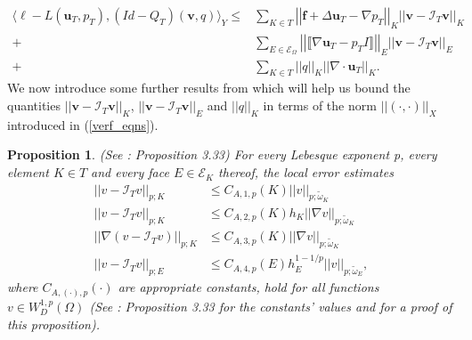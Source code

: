 \documentclass[12pt,a4paper]{article}
\newtheorem{proposition}[theorem]{Proposition}
\theoremstyle{definition}
\begin{document}
\begin{equation}\label{verf-a-posteriori-bound-cs}
\begin{aligned}
\langle \ell -L\left(\textbf{u}_T,p_T\right),\left(Id-Q_T\right)\left(\textbf{v},q\right) \rangle_Y\leq
&\sum_{K\in T}\left|\left|\textbf{f}+\Delta \textbf{u}_T-\nabla p_T \right|\right|_K \left|\left|\textbf{v}-\mathcal{I}_T\textbf{v}\right|\right|_K\\
+&\sum_{E\in \mathcal{E}_{\Omega}}\left|\left|\llbracket\nabla \textbf{u}_T-p_TI\rrbracket \right|\right|_E \left|\left|\textbf{v}-\mathcal{I}_T\textbf{v}\right|\right|_E\\
+&\sum_{K\in T}\left|\left|q\right|\right|_K\left|\left|\nabla \cdot \textbf{u}_T\right|\right|_K.
\end{aligned}
\end{equation}
We now introduce some further results from \cite{verfurth2013posteriori} which will help us bound the quantities $\left|\left|\textbf{v}-\mathcal{I}_T\textbf{v}\right|\right|_K$, $\left|\left|\textbf{v}-\mathcal{I}_T\textbf{v}\right|\right|_E$ and $\left|\left|q\right|\right|_K$ in terms of the norm $\left|\left|\left(\cdot,\cdot\right)\right|\right|_X$ introduced in (\ref{verf_eqns}).
\begin{proposition}{(See \cite[ \S3.5]{verfurth2013posteriori}: Proposition 3.33)} \label{verf_prop_bounds} For every Lebesque exponent p, every element $K\in T$ and every face $E\in\mathcal{E}_K$ thereof, the local error estimates
\begin{equation}\label{proposition_bounds_verf}
\begin{aligned}
\left|\left|v-\mathcal{I}_Tv\right|\right|_{p;K}&\leq C_{A,1,p}\left(K\right)\left|\left|v\right|\right|_{p;\widetilde{\omega}_K}\\
\left|\left|v-\mathcal{I}_Tv\right|\right|_{p;K}&\leq C_{A,2,p}\left(K\right)h_K\left|\left|\nabla v\right|\right|_{p;\widetilde{\omega}_K}\\
\left|\left|\nabla\left(v-\mathcal{I}_Tv\right)\right|\right|_{p;K}&\leq C_{A,3,p}\left(K\right)\left|\left|\nabla v\right|\right|_{p;\widetilde{\omega}_K}\\
\left|\left|v-\mathcal{I}_Tv\right|\right|_{p;E}&\leq C_{A,4,p}\left(E\right)h_E^{1-1/p}\left|\left|v\right|\right|_{p;\widetilde{\omega}_E},
\end{aligned}\nonumber
\end{equation}
where $C_{A,\left(\cdot\right),p}\left(\cdot\right)$ are appropriate constants, hold for all functions $v\in W^{1,p}_D\left(\Omega\right)$ (See \cite{verfurth2013posteriori}: Proposition 3.33 for the constants' values and for a proof of this proposition).
\end{proposition}
\end{document}
